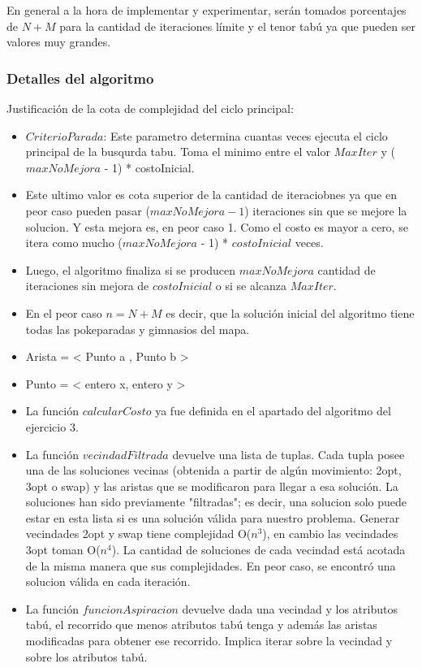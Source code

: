 En general a la hora de implementar y experimentar, serán tomados porcentajes de $N+M$ para la cantidad de iteraciones límite y el tenor tabú ya que pueden ser valores muy grandes.\\

\subsubsection*{Detalles del algoritmo}
Justificación de la cota de complejidad del ciclo principal:
\begin{itemize}

\item $CriterioParada$: Este parametro determina cuantas veces ejecuta el ciclo principal de la busqurda tabu. Toma el minimo entre el valor $MaxIter$ y ($maxNoMejora$ - 1) * costoInicial.
\item Este ultimo valor es cota superior de la cantidad de iteraciobnes ya que en peor caso pueden pasar ($maxNoMejora - 1$) iteraciones sin que se mejore la solucion. Y esta mejora es, en peor caso 1. Como el costo es mayor a cero, se itera como mucho ($maxNoMejora$ - 1) * $costoInicial$ veces.
\item Luego, el algoritmo finaliza si se producen $maxNoMejora$ cantidad de iteraciones sin mejora de $costoInicial$ o si se alcanza $MaxIter$. 
\item En el peor caso $n = N+M$ es decir, que la solución inicial del algoritmo tiene todas las pokeparadas y gimnasios del mapa.
\item Arista = < Punto a , Punto b >
\item Punto = < entero x, entero y >
\item La función $calcularCosto$ ya fue definida en el apartado del algoritmo del ejercicio 3.
\item La función $vecindadFiltrada$ devuelve una lista de tuplas. Cada tupla posee una de las soluciones vecinas (obtenida a partir de algún movimiento: 2opt, 3opt o swap) y las aristas que se modificaron para llegar a esa solución. La soluciones han sido previamente "filtradas"; es decir, una solucion solo puede estar en esta lista si es una solución válida para nuestro problema. Generar vecindades 2opt y swap tiene complejidad O($n^3$), en cambio las vecindades 3opt toman O($n^4$).
	La cantidad de soluciones de cada vecindad está acotada de la misma manera que sus complejidades. En peor caso, se encontró una solucion válida en cada iteraci\'on.
\item La función $funcionAspiracion$ devuelve dada una vecindad y los atributos tabú, el recorrido que menos atributos tabú tenga y además las aristas modificadas para obtener ese recorrido. Implica iterar sobre la vecindad y sobre los atributos tabú. 

\end{itemize}
